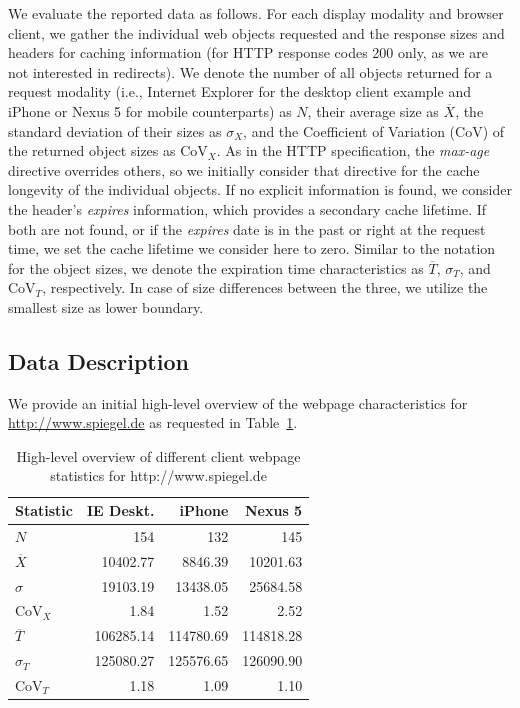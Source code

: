 \documentclass[letterpaper,conference]{IEEEtran}
\begin{document}
We evaluate the reported data as follows. For each display modality and browser client, we gather the individual web objects requested and the response sizes and headers for caching information (for HTTP response codes 200 only, as we are not interested in redirects).
We denote the number of all objects returned for a request modality (i.e., Internet Explorer for the desktop client example and iPhone or Nexus 5 for mobile counterparts) as $N$, their average size as $\overline{X}$, the standard deviation of their sizes as ${\sigma}_{X}$, and the Coefficient of Variation (CoV) of the returned object sizes as $\mathrm{CoV}_{X}$. As in the HTTP specification, the \emph{max-age} directive overrides others, so we initially consider that directive for the cache longevity of the individual objects. If no explicit information is found, we consider the header's \emph{expires} information, which provides a secondary cache lifetime. If both are not found, or if the \emph{expires} date is in the past or right at the request time, we set the cache lifetime we consider here to zero. 
Similar to the notation for the object sizes, we denote the expiration time characteristics as $\overline{T}$, $\sigma_{T}$, and $\mathrm{CoV}_{T}$, respectively.
In case of size differences between the three, we utilize the smallest size as lower boundary.


\subsection{Data Description}

We provide an initial high-level overview of the webpage characteristics for \url{http://www.spiegel.de} as requested in Table~\ref{tab:spiegel}.
\begin{table}
\centering
\caption{High-level overview of different client webpage statistics for http://www.spiegel.de}
\label{tab:spiegel}
\begin{tabular}{|l|r|r|r|}
	\hline
	Statistic          & IE Deskt. &    iPhone &   Nexus 5 \\ \hline
	$N$                &       154 &       132 &       145 \\ \hline\hline
	$\overline{X}$     &  10402.77 &   8846.39 &  10201.63 \\ \hline
	$\sigma$           &  19103.19 &  13438.05 &  25684.58 \\ \hline
	$\mathrm{CoV}_{X}$ &      1.84 &      1.52 &      2.52 \\ \hline\hline
	$\overline{T}$     & 106285.14 & 114780.69 & 114818.28 \\ \hline
	$\sigma_{T}$       & 125080.27 & 125576.65 & 126090.90 \\ \hline
	$\mathrm{CoV}_{T}$ &      1.18 &      1.09 &      1.10 \\ \hline
\end{tabular}
\end{table}
\end{document}
